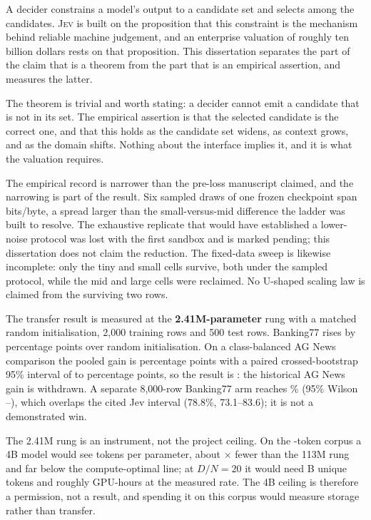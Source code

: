 A decider constrains a model's output to a candidate set and selects among the
candidates. \textsc{Jev} is built on the proposition that this constraint is the
mechanism behind reliable machine judgement, and an enterprise valuation of
roughly ten billion dollars rests on that proposition. This dissertation separates
the part of the claim that is a theorem from the part that is an empirical
assertion, and measures the latter.

The theorem is trivial and worth stating: a decider cannot emit a candidate that
is not in its set. The empirical assertion is that the selected candidate is the
correct one, and that this holds as the candidate set widens, as context grows,
and as the domain shifts. Nothing about the interface implies it, and it is what
the valuation requires.

The empirical record is narrower than the pre-loss manuscript claimed, and the
narrowing is part of the result. Six sampled draws of one frozen checkpoint span
\ProtoOldSpread{} bits/byte, a spread larger than the small-versus-mid difference
the ladder was built to resolve. The exhaustive replicate that would have
established a lower-noise protocol was lost with the first sandbox and is marked
pending; this dissertation does not claim the reduction. The fixed-data sweep is
likewise incomplete: only the tiny and small cells survive, both under the sampled
protocol, while the mid and large cells were reclaimed. No U-shaped scaling law is
claimed from the surviving two rows.

The transfer result is measured at the \textbf{2.41M-parameter} rung with a
matched random initialisation, 2,000 training rows and 500 test rows. Banking77
rises by \TransferBankGain{} percentage points over random initialisation. On a
class-balanced AG News comparison the pooled gain is \TransferAgGain{} percentage
points with a paired crossed-bootstrap 95\% interval of \TransferAgLo{} to
\TransferAgHi{} percentage points, so the result is \TransferAgVerdict: the
historical AG News gain is withdrawn. A separate 8,000-row Banking77 arm reaches
\ShipAcc\% (95\% Wilson \ShipLo--\ShipHi), which overlaps the cited Jev interval
(78.8\%, 73.1--83.6); it is not a demonstrated win.

The 2.41M rung is an instrument, not the project ceiling. On the
\CorpusTokens-token corpus a 4B model would see \FourBDN{} tokens per parameter,
about \FourBFactor$\times$ fewer than the 113M rung and far below the
compute-optimal line; at $D/N=20$ it would need \FourBTokensB{}B unique tokens and
roughly \FourBGPUHours{} GPU-hours at the measured rate. The 4B ceiling is
therefore a permission, not a result, and spending it on this corpus would measure
storage rather than transfer.

